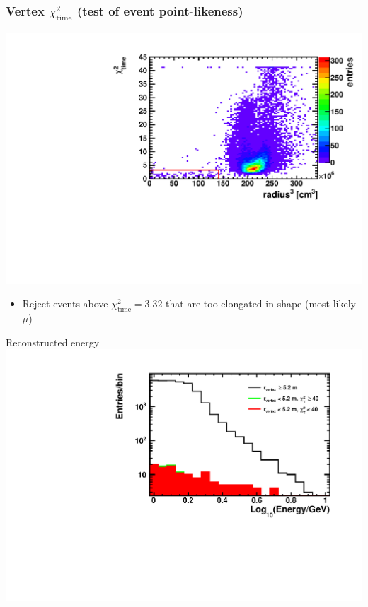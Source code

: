 \documentclass[14pt]{beamer}
\begin{document}
\begin{frame}
	\frametitle{Vertex $\chi^{2}_{\mathrm{time}}$ (test of event point-likeness)}
	\centering
	\includegraphics[width=0.8\linewidth]{chi2t_vs_radius-highEnergyRecon.pdf}
	\begin{itemize}
		\item<2-> Reject events above $\chi_{\text{time}}^2 = 3.32$ that are too
			elongated in shape (most likely $\mu$)
	\end{itemize}
\end{frame}

\begin{frame}{Reconstructed energy}
	\centering
	\includegraphics[width=0.7\linewidth]{reconstructed_energy_plot.pdf}
\end{frame}
\end{document}
